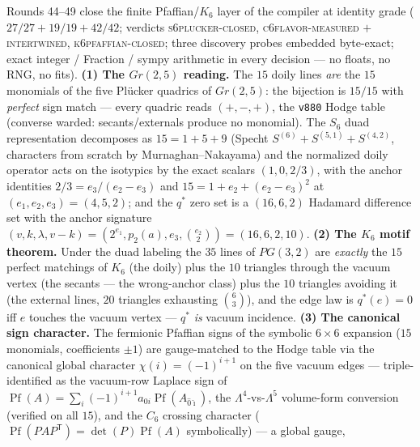\begin{keybox}
Rounds 44--49 close the finite Pfaffian/$K_6$ layer of the
compiler at identity grade ($27/27 + 19/19 + 42/42$; verdicts
\textsc{s6plucker-closed}, \textsc{c6flavor-measured} $+$
\textsc{intertwined}, \textsc{k6pfaffian-closed}; three
discovery probes embedded byte-exact; exact integer / Fraction /
sympy arithmetic in every decision --- no floats, no RNG, no
fits).  \textbf{(1) The $Gr(2,5)$ reading.}  The $15$ doily
lines \emph{are} the $15$ monomials of the five Pl\"ucker
quadrics of $Gr(2,5)$: the bijection is $15/15$ with
\emph{perfect} sign match --- every quadric reads $(+,-,+)$,
the \texttt{v880} Hodge table (converse warded:
secants/externals produce no monomial).  The $S_6$ duad
representation decomposes as $15 = 1 + 5 + 9$ (Specht
$S^{(6)} + S^{(5,1)} + S^{(4,2)}$, characters from scratch by
Murnaghan--Nakayama) and the normalized doily operator acts on
the isotypics by the exact scalars $(1, 0, 2/3)$, with the
anchor identities $2/3 = e_3/(e_2 - e_3)$ and $15 = 1 + e_2 +
(e_2 - e_3)^2$ at $(e_1, e_2, e_3) = (4, 5, 2)$; and the
$q^{*}$ zero set is a $(16, 6, 2)$ Hadamard difference set with
the anchor signature $(v, k, \lambda, v - k) = (2^{e_1},
p_2(a), e_3, \binom{e_2}{2}) = (16, 6, 2, 10)$.  \textbf{(2)
The $K_6$ motif theorem.}  Under the duad labeling the $35$
lines of $PG(3,2)$ are \emph{exactly} the $15$ perfect
matchings of $K_6$ (the doily) plus the $10$ triangles through
the vacuum vertex (the secants --- the wrong-anchor class) plus
the $10$ triangles avoiding it (the external lines, $20$
triangles exhausting $\binom{6}{3}$), and the edge law is
$q^{*}(e) = 0$ iff $e$ touches the vacuum vertex --- $q^{*}$
\emph{is} vacuum incidence.  \textbf{(3) The canonical sign
character.}  The fermionic Pfaffian signs of the symbolic
$6\times6$ expansion ($15$ monomials, coefficients $\pm1$) are
gauge-matched to the Hodge table via the canonical global
character $\chi(i) = (-1)^{i+1}$ on the five vacuum edges ---
triple-identified as the vacuum-row Laplace sign of
$\operatorname{Pf}(A) = \sum_i (-1)^{i+1} a_{0i}
\operatorname{Pf}(A_{\hat{0}\hat{\imath}})$, the
$\Lambda^4$-vs-$\Lambda^5$ volume-form conversion (verified on
all $15$), and the $C_6$ crossing character
($\operatorname{Pf}(PAP^{\mathsf T}) =
\det(P)\operatorname{Pf}(A)$ symbolically) --- a global gauge,

\end{keybox}
